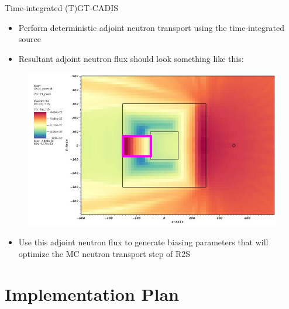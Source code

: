 \documentclass{beamer}
\begin{document}

\begin{frame}{Time-integrated (T)GT-CADIS}
	\begin{itemize}
		\item{Perform deterministic adjoint neutron transport using the
			time-integrated source}
		\item{Resultant adjoint neutron flux should look something like
			this:}
	\end{itemize}
        \begin{figure}
	\centering
	\includegraphics[scale=0.20]{tgt_adj_n.jpg}
	\end{figure}
	\begin{itemize}
		\item{Use this adjoint neutron flux to generate biasing
			parameters that will optimize the MC neutron transport
			step of R2S}
	\end{itemize}
\end{frame}



\section{Implementation Plan}
\end{document}
